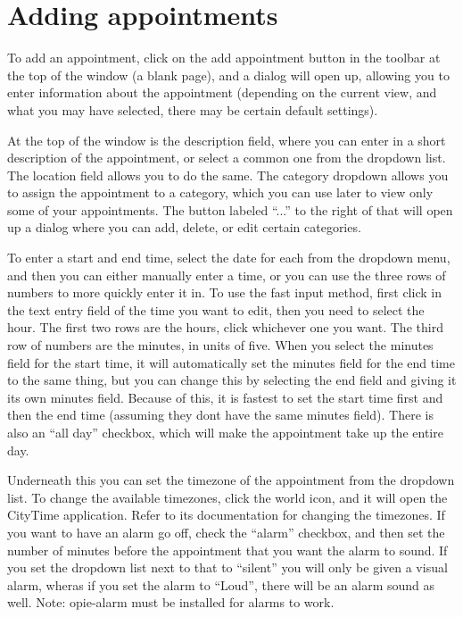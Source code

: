 \documentclass[12pt,letterpaper,oneside, openany]{book} \usepackage[latin1] {inputenc}
\begin{document}
\section{Adding appointments}

To add an appointment, click on the add appointment button in the toolbar at the top of the window (a blank page), and a dialog will open up, allowing you to enter information about the appointment (depending on the current view, and what you may have selected, there may be certain default settings). 

At the top of the window is the description field, where you can enter in a short description of the appointment, or select a common one from the dropdown list. The location field allows you to do the same. The category dropdown allows you to assign the appointment to a category, which you can use later to view only some of your appointments. The button labeled ``...'' to the right of that will open up a dialog where you can add, delete, or edit certain categories. 

To enter a start and end time, select the date for each from the dropdown menu, and then you can either manually enter a time, or you can use the three rows of numbers to more quickly enter it in. To use the fast input method, first click in the text entry field of the time you want to edit, then you need to select the hour. The first two rows are the hours, click whichever one you want. The third row of numbers are the minutes, in units of five. When you select the minutes field for the start time, it will automatically set the minutes field for the end time to the same thing, but you can change this by selecting the end field and giving it its own minutes field. Because of this, it is fastest to set the start time first and then the end time (assuming they dont have the same minutes field). There is also an ``all day'' checkbox, which will make the appointment take up the entire day. 

Underneath this you can set the timezone of the appointment from the dropdown list. To change the available timezones, click the world icon, and it will open the CityTime application. Refer to its documentation for changing the timezones. If you want to have an alarm go off, check the ``alarm'' checkbox, and then set the number of minutes before the appointment that you want the alarm to sound. If you set the dropdown list next to that to ``silent'' you will only be given a visual alarm, wheras if you set the alarm to ``Loud'', there will be an alarm sound as well. Note: opie-alarm must be installed for alarms to work. 
\end{document}
